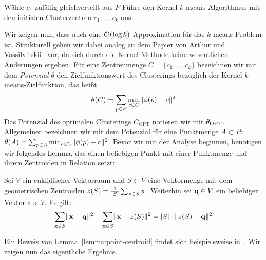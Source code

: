 \begin{algorithm}
\label{algo:kernelkmeanspp}
\caption{\kkmpp}
	\DontPrintSemicolon
	
	\BlankLine
	
	Wähle $c_1$ zufällig gleichverteilt aus $P$\;
	Führe den Kernel-$k$-means-Algorithmus mit den initialen Clusterzentren $c_1, \dots, c_k$ aus.
\end{algorithm}
Wir zeigen nun, dass auch \kkmpp{} eine $\mathcal{O}(\log k)$-Approximation für das $k$-means-Problem ist. Strukturell gehen
wir dabei analog zu dem Papier von Arthur und Vassilvitskii~\cite{ArthurV07} vor, da sich durch die Kernel Methode keine
wesentlichen Änderungen ergeben. Für eine Zentrenmenge $C = \{ c_1, \dots, c_k \}$ bezeichnen wir mit dem \emph{Potenzial}
$\theta$ den Zielfunktionswert des Clusterings bezüglich der Kernel-$k$-means-Zielfunktion, das heißt
\[ \theta(C) = \sum_{p \in P} \min_{c \in C} \lVert {\phi(p)} - {c} \rVert^2 \]
Das Potenzial des optimalen Clusterings $C_\textrm{OPT}$ notieren wir mit $\theta_{\textrm{OPT}}$.
Allgemeiner bezeichnen wir mit dem Potenzial für eine Punktmenge $A \subset P$:
$\theta(A) = \sum_{p \in A} \min_{c \in C} \lVert {\phi(p)} - {c} \rVert^2 $.
Bevor wir mit der Analyse beginnen, benötigen wir folgendes Lemma, das einen beliebigen Punkt mit einer Punktmenge
und ihrem Zentroiden in Relation setzt:

\begin{lemma}
\label{lemma:point-centroid}
	Sei $V$ ein euklidischer Vektorraum und $S \subset V$ eine Vektormenge mit dem geometrischen
	Zentroiden $z(S) = \frac{1}{\left|S\right|} \sum_{\mathbf{x} \in S} \mathbf{x}$.
	Weiterhin sei $\mathbf{q} \in V$ ein beliebiger Vektor aus $V$. Es gilt:
	\[ \sum_{\mathbf{x} \in S} \lVert {\ensuremath{\mathbf{x}}} - {\mathbf{q}} \rVert^2 - \sum_{\mathbf{x} \in S} \lVert {\ensuremath{\mathbf{x}}} - {z(S)} \rVert^2
		= \left|S\right| \cdot \lVert {z(S)} - {\mathbf{q}} \rVert^2 \]
\end{lemma}
Ein Beweis von Lemma~\ref{lemma:point-centroid} findet sich beispielsweise in~\cite[Lemma 2.4.1, S. 25]{Schmidt14}.
Wir zeigen nun das eigentliche Ergebnis.

